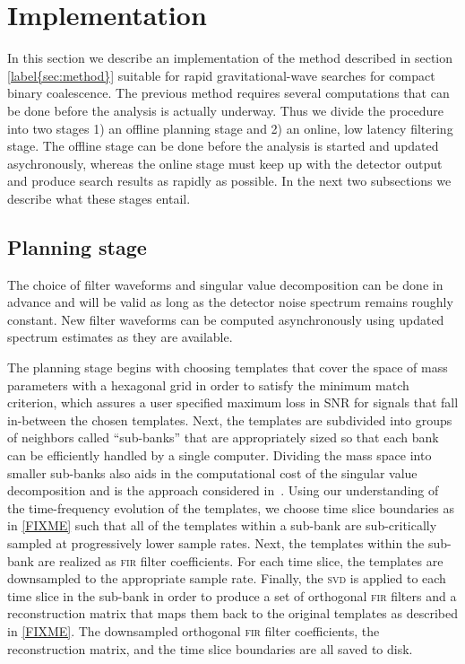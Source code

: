 \section{Implementation}

In this section we describe an implementation of the method described in
section \ref{label{sec:method}} suitable for rapid gravitational-wave searches
for compact binary coalescence.  The previous method requires several
computations that can be done before the analysis is actually underway.  Thus
we divide the procedure into two stages 1) an offline planning stage and 2) an
online, low latency filtering stage.  The offline stage can be done before the
analysis is started and updated asychronously, whereas the online stage must keep
up with the detector output and produce search results as rapidly as possible.
In the next two subsections we describe what these stages entail.

\subsection{Planning stage}

The choice of filter waveforms and singular value decomposition can be done in
advance and will be valid as long as the detector noise spectrum remains
roughly constant.  New filter waveforms can be computed asynchronously using
updated spectrum estimates as they are available. 

The planning stage begins with choosing templates that cover the space of mass
parameters with a hexagonal grid \cite{PhysRevD.76.102004} in order to satisfy
the minimum match criterion, which assures a user specified maximum loss in SNR
for signals that fall in-between the chosen templates.  Next, the templates are
subdivided into groups of neighbors called ``sub-banks'' that are appropriately
sized so that each bank can be efficiently handled by a single computer.
Dividing the mass space into smaller sub-banks also aids in the computational
cost of the singular value decomposition and is the approach considered
in~\cite{Cannon:2010p10398}.  Using our understanding of the time-frequency
evolution of the templates, we choose time slice boundaries as in \eqref{FIXME}
such that all of the templates within a sub-bank are sub-critically sampled at
progressively lower sample rates.  Next, the templates within the sub-bank are
realized as \textsc{fir} filter coefficients.  For each time slice, the
templates are downsampled to the appropriate sample rate.  Finally, the
\textsc{svd} is applied to each time slice in the sub-bank in order to produce
a set of orthogonal \textsc{fir} filters and a reconstruction matrix that maps
them back to the original templates as described in \eqref{FIXME}.  The
downsampled orthogonal \textsc{fir} filter coefficients, the reconstruction
matrix, and the time slice boundaries are all saved to disk.


